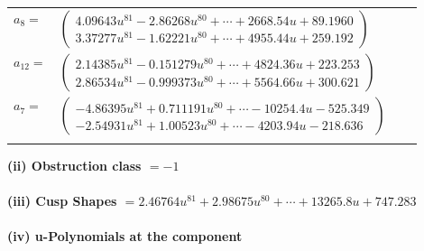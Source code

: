 \documentclass[1p]{elsarticle_modified}
\theoremstyle{definition}
\begin{document}
\begin{tabular}{m{7pt} m{180pt} m{7pt} m{180pt} }
\flushright $a_{8}=$&$\begin{pmatrix}4.09643 u^{81}-2.86268 u^{80}+\cdots+2668.54 u+89.1960\\3.37277 u^{81}-1.62221 u^{80}+\cdots+4955.44 u+259.192\end{pmatrix}$ \\
\flushright $a_{12}=$&$\begin{pmatrix}2.14385 u^{81}-0.151279 u^{80}+\cdots+4824.36 u+223.253\\2.86534 u^{81}-0.999373 u^{80}+\cdots+5564.66 u+300.621\end{pmatrix}$ \\
\flushright $a_{7}=$&$\begin{pmatrix}-4.86395 u^{81}+0.711191 u^{80}+\cdots-10254.4 u-525.349\\-2.54931 u^{81}+1.00523 u^{80}+\cdots-4203.94 u-218.636\end{pmatrix}$\\&\end{tabular}
\flushleft \textbf{(ii) Obstruction class $= -1$}\\~\\
\flushleft \textbf{(iii) Cusp Shapes $= 2.46764 u^{81}+2.98675 u^{80}+\cdots+13265.8 u+747.283$}\\~\\
\newpage\renewcommand{\arraystretch}{1}
\flushleft \textbf{(iv) u-Polynomials at the component}\newline \\
\end{document}
